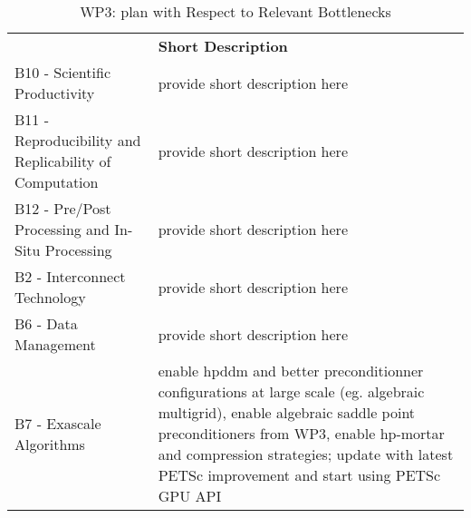 \begin{table}[!ht]
    \centering



    \centering
    {
        \setlength{\parindent}{0pt}
        \def\arraystretch{1.25}
        {
            \fontsize{9}{11}\selectfont
            \begin{tabular}{!{\color{numpexgray}\vrule}p{.25\linewidth}!{\color{numpexgray}\vrule}p{.6885\linewidth}!{\color{numpexgray}\vrule}}

     &  {\rule{0pt}{2.5ex}\color{white}\bf Short Description }\\

    B10 - Scientific Productivity & provide short description here \\
    B11 - Reproducibility and Replicability of Computation & provide short description here \\
    B12 - Pre/Post Processing and In-Situ Processing & provide short description here \\
    B2 - Interconnect Technology & provide short description here \\
    B6 - Data Management & provide short description here \\
    B7 - Exascale Algorithms & enable hpddm and better preconditionner configurations at large scale (eg. algebraic multigrid), enable algebraic saddle point preconditioners from WP3, enable hp-mortar and compression strategies; update with latest PETSc improvement and start using PETSc GPU API\\
\hline
\end{tabular}
        }
    }
    \caption{WP3: \Feelpp plan with Respect to Relevant Bottlenecks}
    \label{tab:WP3:Feelpp:bottlenecks}
\end{table}
